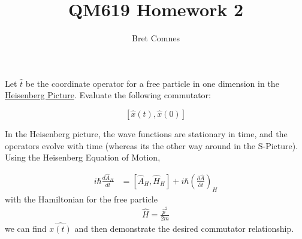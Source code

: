 \documentclass{jhwhw}
\author{Bret Comnes}
\title{QM619 Homework 2}
\begin{document}
Let $\hat{t}$ be the coordinate operator for a free particle in one dimension in the \underline{Heisenberg Picture}.  Evaluate the following commutator:

\begin{equation}
	\left[\hat{x}(t),\hat{x}(0) \right]
\end{equation}

\solution
In the Heisenberg picture, the wave functions are stationary in time, and the operators evolve with time (whereas its the other way around in the S-Picture).  Using the Heisenberg Equation of Motion,

\begin{align}
	\label{eq:heom}
	i \hbar \frac{d \hat{A}_H}{dt} &= [\hat{A}_H, \hat{H}_H] + i \hbar \left( \frac{
	\partial \hat{A}}{\partial t} \right)_H
\end{align}
with the Hamiltonian for the free particle
\begin{align}
	\hat{H} = \frac{\hat{p}^2}{2m}
\end{align}
we can find $\hat{x(t)}$ and then demonstrate the desired commutator relationship.
\end{document}

